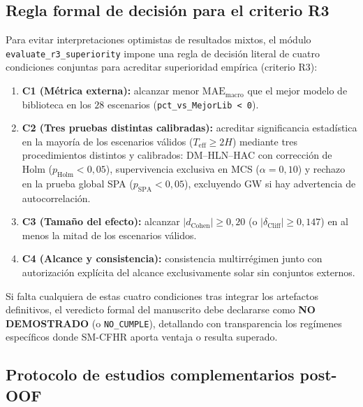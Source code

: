\subsection{Regla formal de decisión para el criterio R3}

Para evitar interpretaciones optimistas de resultados mixtos, el módulo \texttt{evaluate\_r3\_superiority} impone una regla de decisión literal de cuatro condiciones conjuntas para acreditar superioridad empírica (criterio R3):
\begin{enumerate}
    \item \textbf{C1 (Métrica externa):} alcanzar menor $\mathrm{MAE}_{\mathrm{macro}}$ que el mejor modelo de biblioteca en los $28$ escenarios (\texttt{pct\_vs\_MejorLib < 0}).
    \item \textbf{C2 (Tres pruebas distintas calibradas):} acreditar significancia estadística en la mayoría de los escenarios válidos ($T_{\mathrm{eff}} \ge 2H$) mediante tres procedimientos distintos y calibrados: DM--HLN--HAC con corrección de Holm ($p_{\mathrm{Holm}} < 0{,}05$), supervivencia exclusiva en MCS ($\alpha = 0{,}10$) y rechazo en la prueba global SPA ($p_{\mathrm{SPA}} < 0{,}05$), excluyendo GW si hay advertencia de autocorrelación.
    \item \textbf{C3 (Tamaño del efecto):} alcanzar $|d_{\mathrm{Cohen}}| \ge 0{,}20$ (o $|\delta_{\mathrm{Cliff}}| \ge 0{,}147$) en al menos la mitad de los escenarios válidos.
    \item \textbf{C4 (Alcance y consistencia):} consistencia multirrégimen junto con autorización explícita del alcance exclusivamente solar sin conjuntos externos.
\end{enumerate}
Si falta cualquiera de estas cuatro condiciones tras integrar los artefactos definitivos, el veredicto formal del manuscrito debe declararse como \textbf{NO DEMOSTRADO} (o \texttt{NO\_CUMPLE}), detallando con transparencia los regímenes específicos donde SM-CFHR aporta ventaja o resulta superado.

\subsection{Protocolo de estudios complementarios post-OOF}

